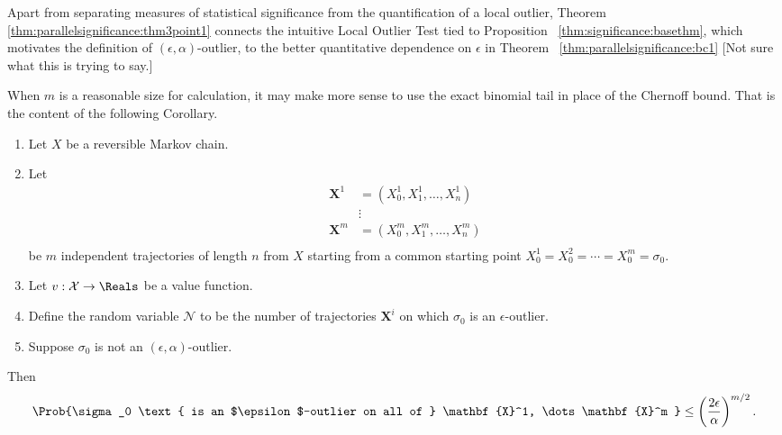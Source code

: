 \documentclass[12pt]{article}
\begin{document}
\begin{remark}
    Apart from separating measures of statistical significance from the
    quantification of a local outlier, Theorem~%
    \ref{thm:parallelsignificance:thm3point1} connects the intuitive
    Local Outlier Test tied to Proposition~%
    \ref{thm:significance:basethm}, which motivates the definition of \(
    (\epsilon, \alpha) \)-outlier, to the better quantitative dependence
    on \( \epsilon \) in Theorem~%
    \ref{thm:parallelsignificance:bc1} [Not sure what this is trying to
    say.]
\end{remark}

\begin{remark}
    When \( m \) is a reasonable size for calculation, it may make more
    sense to use the exact binomial tail in place of the Chernoff bound.
    That is the content of the following Corollary.
\end{remark}

\begin{corollary}
    \label{cor:parallelsignificance:cor32}
    \begin{enumerate}
        \item
            Let \( X \) be a reversible Markov chain.
        \item
            Let
            \begin{align*}
                \mathbf{X}^1 &= (X_0^1, X_1^1, \dots, X_n^1 )\\
                &\vdots \\
                \mathbf{X}^m &= (X_0^m, X_1^m, \dots, X_n^m )\\
            \end{align*}
            be \( m \) independent trajectories of length \( n \) from \(
            X \) starting from a common starting point \( X_0^1 = X_0^2
            = \cdots = X_0^m = \sigma_0 \).
        \item
            Let \( v :  \mathcal{X} \to \Reals \) be a value function.
        \item
            Define the random variable \( \mathcal{N} \) to be the
            number of trajectories \( \mathbf{X}^i \) on which \( \sigma_0
            \) is an \( \epsilon \)-outlier.
        \item
            Suppose \( \sigma_0 \) is not an \( (\epsilon, \alpha) \)-outlier.
    \end{enumerate}
    Then
    \[
        \Prob{\sigma_0 \text{ is an $\epsilon$-outlier on all of }
        \mathbf {X}^1, \dots \mathbf{X}^m } \le \left( \frac{2\epsilon}{\alpha}
        \right)^{m/2}.
    \]
\end{corollary}
\end{document}
